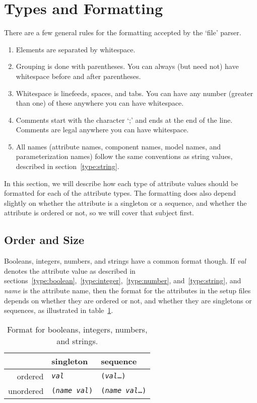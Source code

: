 \section{Types and Formatting}
\label{sec:types}

There are a few general rules for the formatting accepted by the
`file' parser.  
\begin{enumerate}
\item Elements are separated by whitespace.
\item Grouping is done with parentheses.  You can always (but need
  not) have whitespace before and after parentheses.
\item Whitespace is linefeeds, spaces, and tabs.  You can have any
  number (greater than one) of these anywhere you can have whitespace.
\item Comments start with the character `;' and ends at the end of the
  line.  Comments are legal anywhere you can have whitespace.
\item All names (attribute names, component names, model names, and
  parameterization names) follow the same conventions as string
  values, described in section~\ref{type:string}.
\end{enumerate}

In this section, we will describe how each type of attribute values
should be formatted for each of the attribute types.  The formatting
does also depend slightly on whether the attribute is a singleton or
a sequence, and whether the attribute is ordered or not, so we will
cover that subject first.

\subsection{Order and Size}
\label{sec:order-size}

Booleans, integers, numbers, and strings have a common format though.
If \emph{val} denotes the attribute value as described in
sections~\ref{type:boolean},~\ref{type:integer},~\ref{type:number},
and~\ref{type:string}, and \emph{name} is the attribute name, then
the format for the attributes in the setup files depends on whether they
are ordered or not, and whether they are singletons or sequences, as
illustrated in table~\ref{tab:simple-types}.

\begin{table}[htbp]
  \begin{center}
    \begin{tabular}{|r|l|l|}\hline
                & singleton           
                & sequence \\\hline
      ordered   & \texttt{\emph{val}} 
                & \texttt{(\emph{val}\ldots{})} \\\hline
      unordered & \texttt{(\emph{name} \emph{val})}
                & \texttt{(\emph{name} \emph{val}\ldots{})}\\\hline
    \end{tabular}
  \end{center}
  \caption{Format for booleans, integers, numbers, and strings.}
  \label{tab:simple-types}
\end{table}

